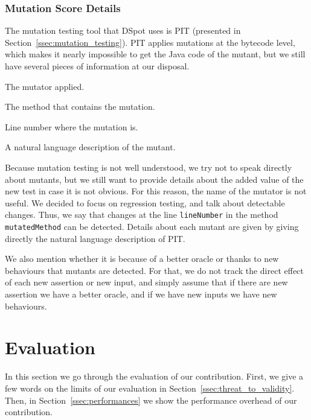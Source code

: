 \documentclass[a4paper,11pt]{sdm_internship}
\newcommand{\todo}[1]{\colorbox{Red!75}{\textcolor{white}{\textbf{TODO\ifx&#1&\else: #1\fi}}}}
\newcommand{\dspot}{DSpot\xspace}
\theoremstyle{definition}
\begin{document}
\subsubsection{Mutation Score Details}%
\label{sssec:mutants_details}
The mutation testing tool that \dspot{} uses is PIT (presented in Section~\ref{ssec:mutation_testing}).
PIT applies mutations at the bytecode level, which makes it nearly impossible to get the Java code of the mutant, but we still have several pieces of information at our disposal.
\begin{description}[itemindent=0em,labelwidth=9em,leftmargin=9em,align=right]
  \item[\texttt{mutantOperator}] The mutator applied.
  \item[\texttt{mutatedMethod}] The method that contains the mutation.
  \item[\texttt{lineNumber}] Line number where the mutation is.
  \item[\texttt{description}] A natural language description of the mutant.
\end{description}

Because mutation testing is not well understood, we try not to speak directly about mutants, but we still want to provide details about the added value of the new test in case it is not obvious.
For this reason, the name of the mutator is not useful.
We decided to focus on regression testing, and talk about detectable changes.
Thus, we say that changes at the line \texttt{lineNumber} in the method \texttt{mutatedMethod} can be detected.
Details about each mutant are given by giving directly the natural language description of PIT\@.

We also mention whether it is because of a better oracle or thanks to new behaviours that mutants are detected.
For that, we do not track the direct effect of each new assertion or new input, and simply assume that if there are new assertion we have a better oracle, and if we have new inputs we have new behaviours.




\section{Evaluation}%
\label{sec:eval}
In this section we go through the evaluation of our contribution.
First, we give a few words on the limits of our evaluation in Section~\ref{ssec:threat_to_validity}.
Then, in Section~\ref{ssec:performances} we show the performance overhead of our contribution.
\end{document}
